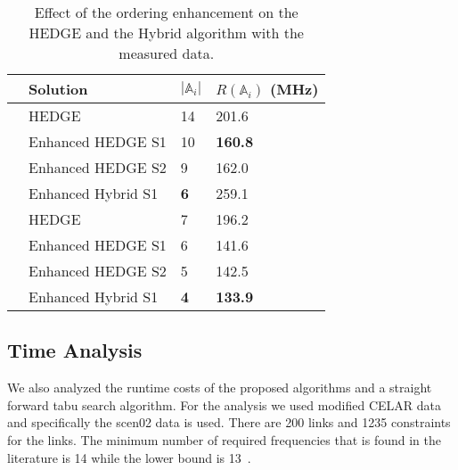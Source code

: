\documentclass[10pt,twocolumn,twoside]{JCNtran}
\newcommand{\tbirkan}[1]{#1}
\newcommand{\linkl}{\ell}
\newcommand{\numlink}{N_{\linkl}}
\newcommand{\rangefa}{R}
\newcommand{\solnfa}[1]{\mbox{$\mathbb{A}$$_{#1}$}}
\begin{document}
\begin{table}[t]
	\caption{Effect of the ordering enhancement on the HEDGE and the Hybrid algorithm with the measured data.}
	\label{tab_results_of_measured_data}
	\centering
	\begin{tabular}{C{0.4cm} L{3.3cm} C{1.1cm} C{2.1cm}}
	\hline
		& Solution &  $|\solnfa{i}|$ & $\rangefa(\solnfa{i})$ (MHz) \\
	\hline
		\parbox[t]{0.1cm}{\multirow{3}{*}{\rotatebox[origin=c]{90}{$\numlink=200\;\;$ }}}& HEDGE   &  14   & 201.6 \\
		 & Enhanced HEDGE S1 			  &  10  & \textbf{160.8} \\
		 & Enhanced HEDGE S2 			  &  9  & 162.0 \\
& Enhanced Hybrid S1 			  &  \textbf{6}  & 259.1 \\
\hline
		\parbox[t]{0pt}{\multirow{3}{*}{\rotatebox[origin=c]{90}{$\numlink=50\;\;$ }}}& HEDGE   &  7   & 196.2 \\
		& Enhanced HEDGE S1 			&  6  & 141.6 \\
		& Enhanced HEDGE S2 			&  5  & 142.5 \\ 
& Enhanced Hybrid S1 		&  \textbf{4}   & \textbf{133.9} \\
\hline
	\end{tabular}
\end{table}


\subsection{\tbirkan{Time Analysis}}
\tbirkan{We also analyzed the runtime costs of the proposed algorithms and a straight forward tabu search algorithm. For the analysis we used modified CELAR data and specifically the scen02 data is used. There are 200 links and 1235 constraints for the links. The minimum number of required frequencies that is found in the literature is 14 while the lower bound is 13~\cite{tiourine1995overviewOA,kolen1994constraintSA,bouju1995intelligentSF}.}
\end{document}
